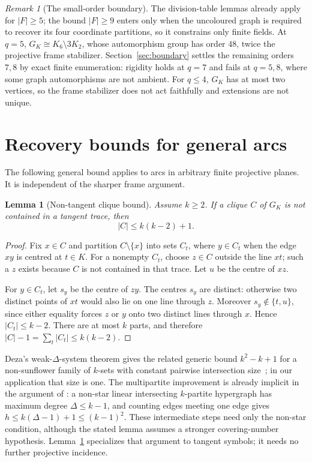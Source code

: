 \documentclass[11pt]{article}
\newtheorem{lemma}[theorem]{Lemma}
\theoremstyle{definition}
\theoremstyle{remark}
\newtheorem{remark}[theorem]{Remark}
\begin{document}
\begin{remark}[The small-order boundary]\label{rem:small-order}
The division-table lemmas already apply for $|F|\geq5$; the bound $|F|\geq9$
enters only when the uncoloured graph is required to recover its four
coordinate partitions, so it constrains only finite fields.  At $q=5$,
$G_K\cong K_6\setminus3K_2$, whose automorphism group has order $48$, twice
the projective frame stabilizer.  Section~\ref{sec:boundary} settles the
remaining orders $7,8$ by exact finite enumeration: rigidity holds at
$q=7$ and fails at $q=5,8$, where some graph automorphisms are not
ambient. For $q\le4$, $G_K$ has at most two vertices, so the frame
stabilizer does not act faithfully and extensions are not unique.
\end{remark}


\section{Recovery bounds for general arcs}\label{sec:general-recovery}

The following general bound applies to arcs in arbitrary finite projective
planes. It is independent of the sharper frame argument.

\begin{lemma}[Non-tangent clique bound]\label{lem:clique}
Assume $k\geq2$.  If a clique $C$ of $G_K$ is not contained in a tangent
trace, then
\[
  |C|\leq k(k-2)+1.
\]
\end{lemma}

\begin{proof}
Fix $x\in C$ and partition $C\setminus\{x\}$ into sets $C_t$, where
$y\in C_t$ when the edge $xy$ is centred at $t\in K$.  For a nonempty
$C_t$, choose $z\in C$ outside the line $xt$; such a $z$ exists because
$C$ is not contained in that trace.  Let $u$ be the centre of $xz$.

For $y\in C_t$, let $s_y$ be the centre of $zy$.  The centres $s_y$ are
distinct: otherwise two distinct points of $xt$ would also lie on one line
through $z$.  Moreover $s_y\notin\{t,u\}$, since either equality forces
$z$ or $y$ onto two distinct lines through $x$.  Hence $|C_t|\leq k-2$.
There are at most $k$ parts, and therefore
$|C|-1=\sum_t|C_t|\leq k(k-2)$.
\end{proof}

Deza's weak-$\Delta$-system theorem gives the related generic bound
$k^2-k+1$ for a non-sunflower family of $k$-sets with constant pairwise
intersection size~\cite{Deza}; in our application that size is one.
The multipartite improvement is already implicit in the argument of
\cite[Lemma 2.2]{FHMW}: a non-star linear intersecting $k$-partite
hypergraph has maximum degree $\Delta\le k-1$, and counting edges meeting
one edge gives $h\le k(\Delta-1)+1\le(k-1)^2$. These intermediate steps
need only the non-star condition, although the stated lemma assumes a
stronger covering-number hypothesis. Lemma~\ref{lem:clique} specializes
that argument to tangent symbols; it needs no further projective incidence.
\end{document}
